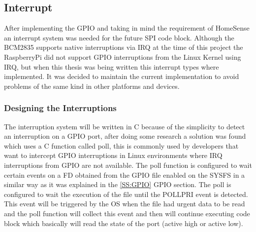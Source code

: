 \subsection{Interrupt}\label{SS:IOSharp-Interrupt}
After implementing the GPIO and taking in mind the requirement of HomeSense an interrupt system was needed for the future \gls{SPI}  code block. Although the \gls{BCM2835} supports native interruptions via \gls{IRQ} at the time of this project the RaspberryPi did not support GPIO interruptions from the Linux Kernel using \gls{IRQ}, but when this thesis was being written this interrupt types where implemented. It was decided to maintain the current implementation to avoid problems of the same kind in other platforms and devices.

\subsubsection{Designing the Interruptions}\label{SSS:IOSharp-Interrupt-Design}
The interruption system will be written in C because of the simplicity to detect an interruption on a GPIO port, after doing some research a solution was found which uses a C function called poll, this is commonly used by developers that want to intercept GPIO interruptions in Linux environments where IRQ interruptions from GPIO are not available. The poll function is configured to wait certain events on a \gls{FD} obtained from the GPIO file enabled on the SYSFS in a similar way as it was explained in the \ref{SS:GPIO} GPIO section. The poll is configured to wait the execution of the file until the POLLPRI event is detected. This event will be triggered by the OS when the file had urgent data to be read and the poll function will collect this event and then will continue executing code block which basically will read the state of the port (active high or active low).


